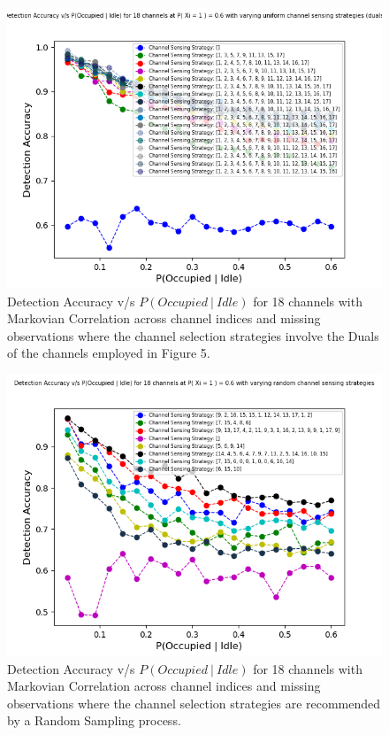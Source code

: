 \documentclass[12pt, draftcls, onecolumn]{IEEEtran}
\begin{document}
\begin{figure}[t]
\includegraphics[width=1.0\textwidth]{Uniform_Channel_Sensing_Duals.png}
\caption{Detection Accuracy v/s $P(Occupied\ |\ Idle)$ for 18 channels with Markovian Correlation across channel indices and missing observations where the channel selection strategies involve the Duals of the channels employed in Figure 5.}
\label{fig:mesh6}
\centering
\end{figure}
\begin{figure}[t]
\includegraphics[width=1.0\textwidth]{Random_Channel_Sensing.png}
\caption{Detection Accuracy v/s $P(Occupied\ |\ Idle)$ for 18 channels with Markovian Correlation across channel indices and missing observations where the channel selection strategies are recommended by a Random Sampling process.}
\label{fig:mesh7}
\centering
\end{figure}
\end{document}
